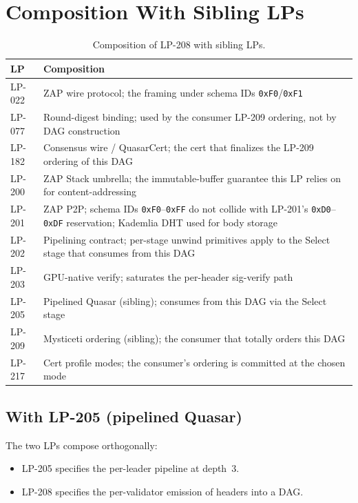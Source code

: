 \section{Composition With Sibling LPs}

\begin{table}[h]
\centering
\small
\begin{tabular}{@{}lp{9cm}@{}}
\toprule
\textbf{LP} & \textbf{Composition} \\
\midrule
LP-022 & ZAP wire protocol; the framing under schema IDs \texttt{0xF0}/\texttt{0xF1} \\
LP-077 & Round-digest binding; used by the consumer LP-209 ordering, not by DAG construction \\
LP-182 & Consensus wire / QuasarCert; the cert that finalizes the LP-209 ordering of this DAG \\
LP-200 & ZAP Stack umbrella; the immutable-buffer guarantee this LP relies on for content-addressing \\
LP-201 & ZAP P2P; schema IDs \texttt{0xF0}--\texttt{0xFF} do not collide with LP-201's \texttt{0xD0}--\texttt{0xDF} reservation; Kademlia DHT used for body storage \\
LP-202 & Pipelining contract; per-stage unwind primitives apply to the Select stage that consumes from this DAG \\
LP-203 & GPU-native verify; saturates the per-header sig-verify path \\
LP-205 & Pipelined Quasar (sibling); consumes from this DAG via the Select stage \\
LP-209 & Mysticeti ordering (sibling); the consumer that totally orders this DAG \\
LP-217 & Cert profile modes; the consumer's ordering is committed at the chosen mode \\
\bottomrule
\end{tabular}
\caption{Composition of LP-208 with sibling LPs.}
\label{tab:composition}
\end{table}

\subsection{With LP-205 (pipelined Quasar)}

The two LPs compose orthogonally:

\begin{itemize}[leftmargin=2em,nosep]
\item LP-205 specifies the per-leader pipeline at depth~$3$.
\item LP-208 specifies the per-validator emission of headers into a DAG.
\end{itemize}

